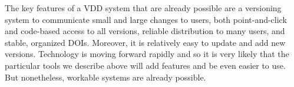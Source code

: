 \documentclass[a4paper,11pt]{article}
\begin{document}
The key features of a VDD system that are already possible are a versioning system to communicate small and large changes to users, both point-and-click and code-based access to all versions, reliable distribution to many users, and stable, organized DOIs.  Moreover, it is relatively easy to update and add new versions.  Technology is moving forward rapidly and so it is very likely that the particular tools we describe above will add features and be even easier to use.  But nonetheless, workable systems are already possible.  



%
%



%
%
%
%
%
%
%
%
\end{document}
